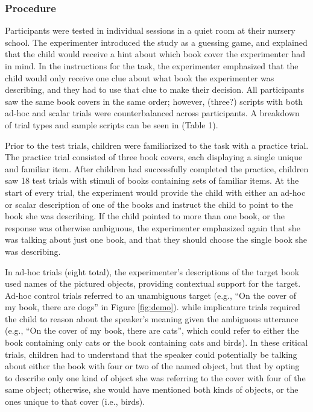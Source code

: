 \documentclass[man]{apa2}
\begin{document}
\subsubsection{Procedure}
Participants were tested in individual sessions in a quiet room at their nursery school. The experimenter introduced the study as a guessing game, and explained that the child would receive a hint about which book cover the experimenter had in mind. In the instructions for the task, the experimenter emphasized that the child would only receive one clue about what book the experimenter was describing, and they had to use that clue to make their decision. All participants saw the same book covers in the same order; however, (three?) scripts with both ad-hoc and scalar trials were counterbalanced across participants. A breakdown of trial types and sample scripts can be seen in (Table 1). 

Prior to the test trials, children were familiarized to the task with a practice trial. The practice trial consisted of three book covers, each displaying a single unique and familiar item. After children had successfully completed the practice, children saw 18 test trials with stimuli of books containing sets of familiar items. At the start of every trial, the experiment would provide the child with either an ad-hoc or scalar description of one of the books and instruct the child to point to the book she was describing. If the child pointed to more than one book, or the response was otherwise ambiguous, the experimenter emphasized again that she was talking about just one book, and that they should choose the single book she was describing. 

In ad-hoc trials (eight total), the experimenter's descriptions of the target book used names of the pictured objects, providing contextual support for the target. Ad-hoc control trials referred to an unambiguous target (e.g., ``On the cover of my book, there are dogs'' in Figure \ref{fig:demo}). while implicature trials required the child to reason about the speaker's meaning given the ambiguous utterance (e.g., ``On the cover of my book, there are cats'', which could refer to either the book containing only cats or the book containing cats and birds). In these critical trials, children had to understand that the speaker could potentially be talking about either the book with four or two of the named object, but that by opting to describe only one kind of object she was referring to the cover with four of the same object; otherwise, she would have mentioned both kinds of objects, or the ones unique to that cover (i.e., birds). 
\end{document}
